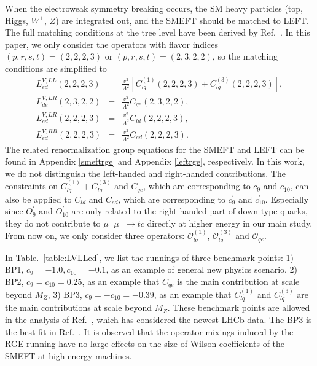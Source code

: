 \documentclass[a4paper,11pt]{article}
\begin{document}
When the electroweak symmetry breaking occurs, the SM heavy particles (top, Higgs,  $W^\pm$,  $Z$) are integrated out, and the SMEFT should be matched to LEFT. 
The full matching conditions at the tree level have been derived by Ref.~\cite{Jenkins:2017jig}.
In this paper, we only consider the operators with flavor indices $(p,r,s,t)=(2,2,2,3)$ or $(p,r,s,t)=(2,3,2,2)$, so the matching conditions are simplified to 
\begin{eqnarray}
    L^{V,LL}_{ed}(2,2,2,3) &=& \frac{v^2}{\Lambda^2}\left[C^{(1)}_{lq}(2,2,2,3)+C^{(3)}_{lq}(2,2,2,3)\right],  \label{match:VLLed}\\
    L^{V,LR}_{de}(2,3,2,2)&=& \frac{v^2}{\Lambda^2}C_{qe}(2,3,2,2), \label{match:VLRde} \\
    L^{V,LR}_{ed}(2,2,2,3)&=& \frac{v^2}{\Lambda^2}C_{ld}(2,2,2,3), \label{match:VLRed} \\
    L^{V,RR}_{ed}(2,2,2,3)&=& \frac{v^2}{\Lambda^2}C_{ed}(2,2,2,3). \label{match:VRRed}
\end{eqnarray}
The related renormalization group equations for the SMEFT and LEFT can be found in Appendix \ref{smeftrge} and Appendix \ref{leftrge}, respectively.
In this work, we do not distinguish the left-handed and right-handed contributions. 
The constraints on $C^{(1)}_{lq}+C^{(3)}_{lq}$ and $C_{qe}$, 
which are corresponding to $c_{9}$ and $c_{10}$, 
can also be applied to $C_{ld}$ and $C_{ed}$, 
which are corresponding to $c^{\prime}_{9}$ and $c^{\prime}_{10}$. Especially since  $O^{\prime}_{9}$ and $O^{\prime}_{10}$ are only related to the right-handed part of down type quarks, they do not contribute to $\mu^+\mu^- \rightarrow tc$ directly at higher energy
 in our main study.
 From now on, we only consider three operators: 
$\mathcal{O}^{(1)}_{lq}$, $\mathcal{O}^{(3)}_{lq}$ and $\mathcal{O}_{qe}$.

In Table.~\ref{table:LVLLed}, we list the runnings of three benchmark points: 
1) BP1, $c_{9}=-1.0, c_{10}=-0.1$, as an example of general new physics scenario, 
2) BP2, $c_{9}=c_{10}=0.25$, as an example that $C_{qe}$ is the main contribution at scale beyond $M_Z$,
3) BP3, $c_{9}=-c_{10}=-0.39$, as an example that $C^{(1)}_{lq}$ and $C^{(3)}_{lq}$ are the main contributions at scale beyond $M_Z$. 
These benchmark points are allowed in the analysis of Ref.~\cite{Ciuchini:2022wbq}, 
which has considered the newest LHCb data.
The BP3 is the best fit in Ref.~\cite{Altmannshofer:2021qrr}. 
It is observed that the operator mixings induced by the RGE running have no large effects on the size of Wilson coefficients of the SMEFT at high energy machines.
\end{document}
